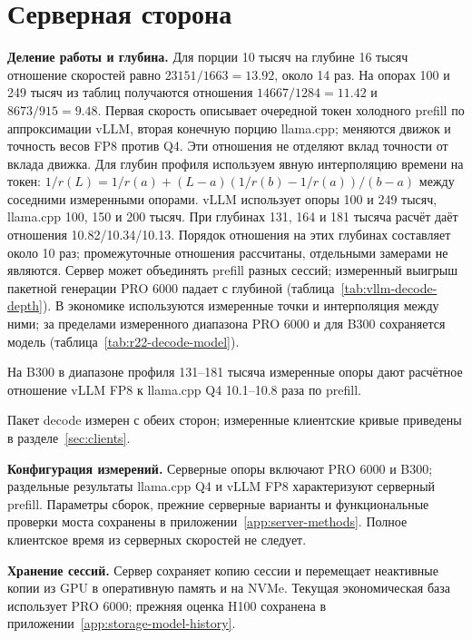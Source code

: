 \section{Серверная сторона}

\textbf{Деление работы и глубина.} Для порции 10 тысяч на глубине 16 тысяч отношение скоростей равно
$23151/1663=13.92$, около 14 раз. На опорах 100 и 249 тысяч из таблиц получаются отношения
$14667/1284=11.42$ и $8673/915=9.48$.
Первая скорость описывает очередной токен холодного prefill по аппроксимации vLLM, вторая конечную порцию llama.cpp;
меняются движок и точность весов FP8 против Q4. Эти отношения не отделяют вклад точности от вклада движка.
Для глубин профиля используем явную интерполяцию времени на токен:
$1/r(L)=1/r(a)+(L-a)(1/r(b)-1/r(a))/(b-a)$ между соседними измеренными опорами.
vLLM использует опоры 100 и 249 тысяч, llama.cpp 100, 150 и 200 тысяч.
При глубинах 131, 164 и 181 тысяча расчёт даёт отношения 10.82/10.34/10.13.
Порядок отношения на этих глубинах составляет около 10 раз; промежуточные отношения рассчитаны, отдельными замерами не являются.
Сервер может объединять prefill разных сессий; измеренный выигрыш пакетной генерации PRO 6000 падает с глубиной
(таблица~\ref{tab:vllm-decode-depth}). В экономике используются измеренные точки и интерполяция между ними;
за пределами измеренного диапазона PRO 6000 и для B300 сохраняется модель (таблица~\ref{tab:r22-decode-model}).

На B300 в диапазоне профиля 131--181 тысяча измеренные опоры дают расчётное отношение vLLM FP8 к llama.cpp Q4 10.1--10.8 раза по prefill.

Пакет decode измерен с обеих сторон; измеренные клиентские кривые приведены в разделе~\ref{sec:clients}.

\label{sec:server}

\textbf{Конфигурация измерений.} Серверные опоры включают PRO 6000 и B300;
раздельные результаты llama.cpp Q4 и vLLM FP8 характеризуют серверный prefill.
Параметры сборок, прежние серверные варианты и функциональные проверки моста сохранены
в приложении~\ref{app:server-methods}. Полное клиентское время из серверных скоростей не следует.

\textbf{Хранение сессий.} Сервер сохраняет копию сессии и перемещает неактивные копии из GPU в оперативную память и на NVMe. Текущая экономическая база использует PRO 6000; прежняя оценка H100 сохранена в приложении~\ref{app:storage-model-history}.

